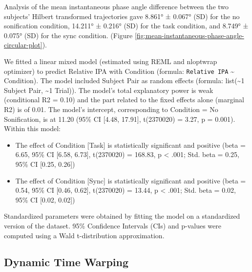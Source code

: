 \documentclass[10pt,a4paper,onecolumn]{article}
\providecommand{\tightlist}{%
  \setlength{\itemsep}{0pt}\setlength{\parskip}{0pt}}
\begin{document}
Analysis of the mean instantaneous phase angle difference between the two subjects' Hilbert transformed trajectories gave
8.861° ± 0.067° (SD) for the no sonification condition,
14.211° ± 0.216° (SD) for the task condition, and
8.749° ± 0.075° (SD) for the sync condition. (Figure \ref{fig:mean-instantaneous-phase-angle-circular-plot}).

We fitted a linear mixed model (estimated using REML and nloptwrap optimizer) to predict Relative IPA with Condition (formula: \texttt{Relative\ IPA} \textasciitilde{} Condition). The model included Subject Pair as random effects (formula: list(\textasciitilde1 \textbar{} Subject Pair, \textasciitilde1 \textbar{} Trial)). The model's total explanatory power is weak (conditional R2 = 0.10) and the part related to the fixed effects alone (marginal R2) is of 0.01. The model's intercept, corresponding to Condition = No Sonification, is at 11.20 (95\% CI {[}4.48, 17.91{]}, t(2370020) = 3.27, p = 0.001). Within this model:

\begin{itemize}
\tightlist
\item
  The effect of Condition {[}Task{]} is statistically significant and positive (beta = 6.65, 95\% CI {[}6.58, 6.73{]}, t(2370020) = 168.83, p \textless{} .001; Std. beta = 0.25, 95\% CI {[}0.25, 0.26{]})
\item
  The effect of Condition {[}Sync{]} is statistically significant and positive (beta = 0.54, 95\% CI {[}0.46, 0.62{]}, t(2370020) = 13.44, p \textless{} .001; Std. beta = 0.02, 95\% CI {[}0.02, 0.02{]})
\end{itemize}

Standardized parameters were obtained by fitting the model on a standardized version of the dataset. 95\% Confidence Intervals (CIs) and p-values were computed using a Wald t-distribution approximation.

\hypertarget{dynamic-time-warping-1}{%
\subsection{Dynamic Time Warping}\label{dynamic-time-warping-1}}
\end{document}
